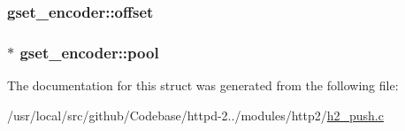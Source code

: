 \subsubsection[{\texorpdfstring{offset}{offset}}]{ gset\+\_\+encoder\+::offset}\hypertarget{structgset__encoder_ad8c4e1489f085caf097ad9fbe0d985dc}{}\label{structgset__encoder_ad8c4e1489f085caf097ad9fbe0d985dc}
\subsubsection[{\texorpdfstring{pool}{pool}}]{$\ast$ gset\+\_\+encoder\+::pool}\hypertarget{structgset__encoder_a9b16366f9a92961fe86e32fb2963acde}{}\label{structgset__encoder_a9b16366f9a92961fe86e32fb2963acde}


The documentation for this struct was generated from the following file\+:\begin{DoxyCompactItemize}
\item 
/usr/local/src/github/\+Codebase/httpd-\/2../modules/http2/\hyperlink{h2__push_8c}{h2\+\_\+push.\+c}\end{DoxyCompactItemize}
